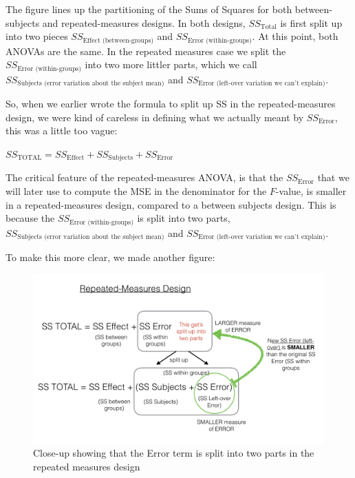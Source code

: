 \documentclass[]{book}
\begin{document}
The figure lines up the partitioning of the Sums of Squares for both between-subjects and repeated-measures designs. In both designs, \(SS_\text{Total}\) is first split up into two pieces \(SS_\text{Effect (between-groups)}\) and \(SS_\text{Error (within-groups)}\). At this point, both ANOVAs are the same. In the repeated measures case we split the \(SS_\text{Error (within-groups)}\) into two more littler parts, which we call \(SS_\text{Subjects (error variation about the subject mean)}\) and \(SS_\text{Error (left-over variation we can't explain)}\).

So, when we earlier wrote the formula to split up SS in the repeated-measures design, we were kind of careless in defining what we actually meant by \(SS_\text{Error}\), this was a little too vague:

\(SS_\text{TOTAL} = SS_\text{Effect} + SS_\text{Subjects} +SS_\text{Error}\)

The critical feature of the repeated-measures ANOVA, is that the \(SS_\text{Error}\) that we will later use to compute the MSE in the denominator for the \(F\)-value, is smaller in a repeated-measures design, compared to a between subjects design. This is because the \(SS_\text{Error (within-groups)}\) is split into two parts, \(SS_\text{Subjects (error variation about the subject mean)}\) and \(SS_\text{Error (left-over variation we can't explain)}\).

To make this more clear, we made another figure:

\begin{figure}
\centering
\includegraphics{figures/SS_RMANOVA.png}
\caption{\label{fig:8moresplit}Close-up showing that the Error term is split into two parts in the repeated measures design}
\end{figure}
\end{document}
